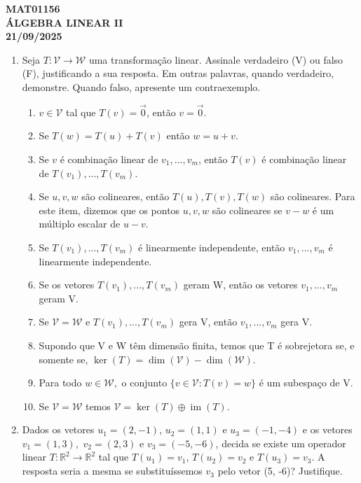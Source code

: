 \documentclass[12pt]{article}
\DeclareMathOperator{\im}{im}
\begin{document}
\begin{center}
    \textbf{MAT01156 \\ ÁLGEBRA LINEAR II} \\
    \textbf{21/09/2025}
\end{center}

\begin{enumerate}
    \item Seja $T:\mathcal{V}\rightarrow\mathcal{W}$ uma transformação linear. Assinale verdadeiro (V) ou falso (F), justificando a sua resposta. Em outras palavras, quando verdadeiro, demonstre. Quando falso, apresente um contraexemplo.
    \begin{enumerate}
        \item[( \ )] $v\in\mathcal{V}$ tal que $T(v)=\vec{0}$, então $v=\vec{0}.$
        \item[( \ )] Se $T(w)=T(u)+T(v)$ então $w=u+v$.
        \item[( \ )] Se $v$ é combinação linear de $v_{1},...,v_{m}$, então $T(v)$ é combinação linear de $T(v_{1}),...,T(v_{m}).$
        \item[( \ )] Se $u, v, w$ são colineares, então $T(u), T(v), T(w)$ são colineares. Para este item, dizemos que os pontos $u, v, w$ são colineares se $v-w$ é um múltiplo escalar de $u-v$.
        \item[( \ )] Se $T(v_{1}),...,T(v_{m})$ é linearmente independente, então $v_{1},...,v_{m}$ é linearmente independente.
        \item[( \ )] Se os vetores $T(v_{1}),...,T(v_{m})$ geram W, então os vetores $v_{1},...,v_{m}$ geram V.
        \item[( \ )] Se $\mathcal{V} = \mathcal{W}$ e $T(v_1),..., T(v_m)$ gera V, então $v_{1},...,v_{m}$ gera V.
        \item[( \ )] Supondo que V e W têm dimensão finita, temos que T é sobrejetora se, e somente se, $\ker(T)=\dim(\mathcal{V})-\dim(\mathcal{W})$.
        \item[( \ )] Para todo $w\in\mathcal{W},$ o conjunto $\{v\in\mathcal{V}:T(v)=w\}$ é um subespaço de V.
        \item[( \ )] Se $\mathcal{V}=\mathcal{W}$ temos $\mathcal{V}=\ker(T)\oplus \im(T)$.
    \end{enumerate}

    \item Dados os vetores $u_{1}=(2,-1)$, $u_{2}=(1, 1)$ e $u_{3}=(-1,-4)$ e os vetores $v_{1}=(1,3),$ $v_{2}=(2,3)$ e $v_{3}=(-5,-6)$, decida se existe um operador linear $T:\mathbb{R}^{2}\rightarrow\mathbb{R}^{2}$ tal que $T(u_{1})=v_{1}$, $T(u_{2})=v_{2}$ e $T(u_{3})=v_{3}$. 
    A resposta seria a mesma se substituíssemos $v_{3}$ pelo vetor (5, -6)? Justifique.


\end{enumerate}
\end{document}
